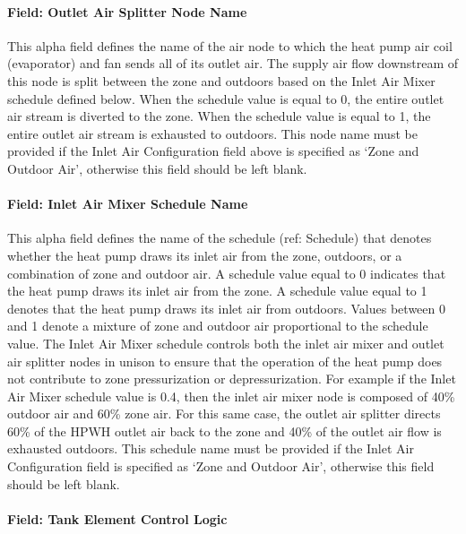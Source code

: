 \paragraph{Field: Outlet Air Splitter Node Name}\label{field-outlet-air-splitter-node-name}

This alpha field defines the name of the air node to which the heat pump air coil (evaporator) and fan sends all of its outlet air. The supply air flow downstream of this node is split between the zone and outdoors based on the Inlet Air Mixer schedule defined below. When the schedule value is equal to 0, the entire outlet air stream is diverted to the zone. When the schedule value is equal to 1, the entire outlet air stream is exhausted to outdoors. This node name must be provided if the Inlet Air Configuration field above is specified as `Zone and Outdoor Air', otherwise this field should be left blank.

\paragraph{Field: Inlet Air Mixer Schedule Name}\label{field-inlet-air-mixer-schedule-name}

This alpha field defines the name of the schedule (ref: Schedule) that denotes whether the heat pump draws its inlet air from the zone, outdoors, or a combination of zone and outdoor air. A schedule value equal to 0 indicates that the heat pump draws its inlet air from the zone. A schedule value equal to 1 denotes that the heat pump draws its inlet air from outdoors. Values between 0 and 1 denote a mixture of zone and outdoor air proportional to the schedule value. The Inlet Air Mixer schedule controls both the inlet air mixer and outlet air splitter nodes in unison to ensure that the operation of the heat pump does not contribute to zone pressurization or depressurization. For example if the Inlet Air Mixer schedule value is 0.4, then the inlet air mixer node is composed of 40\% outdoor air and 60\% zone air. For this same case, the outlet air splitter directs 60\% of the HPWH outlet air back to the zone and 40\% of the outlet air flow is exhausted outdoors. This schedule name must be provided if the Inlet Air Configuration field is specified as `Zone and Outdoor Air', otherwise this field should be left blank.

\paragraph{Field: Tank Element Control Logic}\label{field-tank-element-control-logic}

